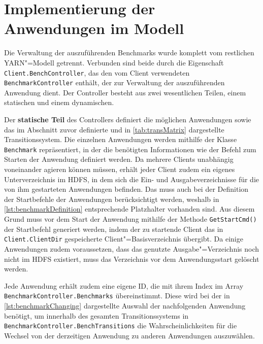 \section{Implementierung der Anwendungen im Modell}
\label{sec:appImplementation}

Die Verwaltung der auszuführenden Benchmarks wurde komplett vom restlichen YARN"=Modell getrennt.
Verbunden sind beide durch die Eigenschaft \texttt{Client.BenchController}, das den vom Client verwendeten \texttt{BenchmarkController} enthält, der zur Verwaltung der auszuführenden Anwendung dient.
Der Controller besteht aus zwei wesentlichen Teilen, einem statischen und einem dynamischen.

Der \textbf{statische Teil} des Controllers definiert die möglichen Anwendungen sowie das im Abschnitt zuvor definierte und in \cref{tab:transMatrix} dargestellte Transitionssystem.
Die einzelnen Anwendungen werden mithilfe der Klasse \texttt{Benchmark} repräsentiert, in der die benötigten Informationen wie \zB der Befehl zum Starten der Anwendung definiert werden.
Da mehrere Clients unabhängig voneinander agieren können müssen, erhält jeder Client zudem ein eigenes Unterverzeichnis im \ac{HDFS}, in dem sich die Ein- und Ausgabeverzeichnisse für die von ihm gestarteten Anwendungen befinden.
Das muss auch bei der Definition der Startbefehle der Anwendungen berücksichtigt werden, weshalb in \cref{lst:benchmarkDefinition} entsprechende Platzhalter vorhanden sind.
Aus diesem Grund muss vor dem Start der Anwendung mithilfe der Methode \texttt{GetStartCmd()} der Startbefehl generiert werden, indem der zu startende Client das in \texttt{Client.ClientDir} gespeicherte Client"=Basisverzeichnis übergibt.
Da einige Anwendungen zudem voraussetzen, dass das genutzte Ausgabe"=Verzeichnis noch nicht im \ac{HDFS} existiert, muss das Verzeichnis vor dem Anwendungsstart gelöscht werden.

Jede Anwendung erhält zudem eine eigene ID, die mit ihrem Index im Array \texttt{BenchmarkController.Benchmarks} übereinstimmt.
Diese wird bei der in \cref{lst:benchmarkChanging} dargestellte Auswahl der nachfolgenden Anwendung benötigt, um innerhalb des gesamten Transitionssystems in \texttt{BenchmarkController.BenchTransitions} die Wahrscheinlichkeiten für die Wechsel von der derzeitigen Anwendung zu anderen Anwendungen auszuwählen.

